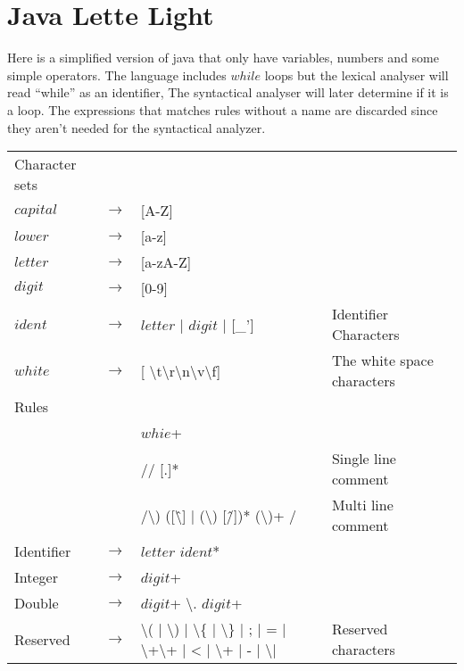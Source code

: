 \chapter{Java Lette Light}\label{reglang}
Here is a simplified version of java that only have variables, numbers and some
simple operators. The language includes $while$ loops but the lexical analyser
will read ``while'' as an identifier, The syntactical analyser will later
determine if it is a loop. The expressions that matches rules without a name
are discarded since they aren't needed for the syntactical analyzer.
\begin{tabular}{l c l l}
Character sets\\
$capital$ & $\rightarrow$ & [A-Z]\\
$lower$   & $\rightarrow$ & [a-z]\\
$letter$  & $\rightarrow$ & [a-zA-Z]\\
$digit$   & $\rightarrow$ & [0-9]\\
$ident$   & $\rightarrow$ & $letter$ | $digit$ | [\_'] & Identifier Characters\\
$white$   & $\rightarrow$ & [ \textbackslash{t}\textbackslash{r}\textbackslash{n}\textbackslash{v}\textbackslash{f}] & The white space characters\\
Rules\\
& & $whie$+\\
& & // [.]* & Single line comment\\
& & /\textbackslash*) ([\^\textbackslash*] | (\textbackslash*) [\^/])*
    (\textbackslash*)+ / & Multi line comment\\
Identifier & $\rightarrow$ & $letter$ $ident$*\\
Integer    & $\rightarrow$ & $digit$+\\
Double     & $\rightarrow$ & $digit$+ \textbackslash. $digit$+\\
Reserved   & $\rightarrow$ & \textbackslash( | \textbackslash) | \textbackslash\{
                         | \textbackslash\} | ; | = | \textbackslash+\textbackslash+
                         | < | \textbackslash+ | - | \textbackslash* | \/ & Reserved characters\\
\end{tabular}
